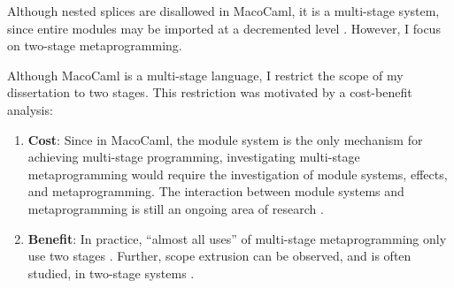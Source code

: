 \begin{enumerate}
  Although nested splices are disallowed in MacoCaml, it is a multi-stage system, since entire modules may be imported at a decremented level \citep{xie-2023}. However, I focus on two-stage metaprogramming. 
\end{enumerate}
  
Although MacoCaml is a multi-stage language, I restrict the scope of my dissertation to two stages. This restriction was motivated by a cost-benefit analysis:
\begin{enumerate}
  \item \textbf{Cost}: Since in MacoCaml, the module system is the only mechanism for achieving multi-stage programming, investigating multi-stage metaprogramming would require the investigation of module systems, effects, and metaprogramming. The interaction between module systems and metaprogramming is still an ongoing area of research \citep{chiang-2024}.
  \item \textbf{Benefit}: In practice, ``almost all uses'' of multi-stage metaprogramming only use two stages \citep{inoue-2012}. Further, scope extrusion can be observed, and is often studied, in two-stage systems \citep{isoda-24,kiselyov-16}.
\end{enumerate}